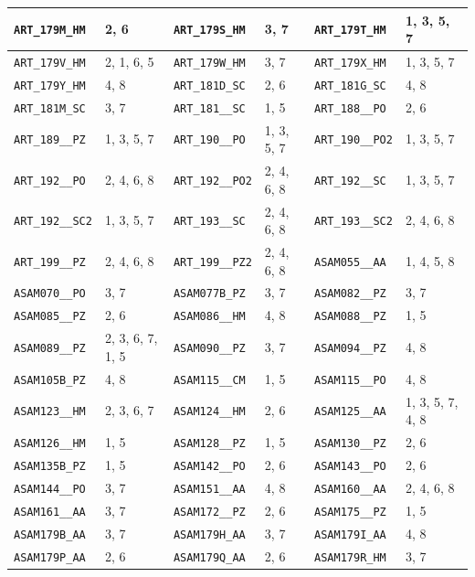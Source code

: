 \begin{longtable}{|l|l||l|l||l|l|}
    \verb|ART_179M_HM| & 2, 6 & \verb|ART_179S_HM| & 3, 7 & \verb|ART_179T_HM| & 1, 3, 5, 7\\\hline
    \verb|ART_179V_HM| & 2, 1, 6, 5 & \verb|ART_179W_HM| & 3, 7 & \verb|ART_179X_HM| & 1, 3, 5, 7\\\hline
    \verb|ART_179Y_HM| & 4, 8 & \verb|ART_181D_SC| & 2, 6 & \verb|ART_181G_SC| & 4, 8\\\hline
    \verb|ART_181M_SC| & 3, 7 & \verb|ART_181__SC| & 1, 5 & \verb|ART_188__PO| & 2, 6\\\hline
    \verb|ART_189__PZ| & 1, 3, 5, 7 & \verb|ART_190__PO| & 1, 3, 5, 7 & \verb|ART_190__PO2| & 1, 3, 5, 7\\\hline
    \verb|ART_192__PO| & 2, 4, 6, 8 & \verb|ART_192__PO2| & 2, 4, 6, 8 & \verb|ART_192__SC| & 1, 3, 5, 7\\\hline
    \verb|ART_192__SC2| & 1, 3, 5, 7 & \verb|ART_193__SC| & 2, 4, 6, 8 & \verb|ART_193__SC2| & 2, 4, 6, 8\\\hline
    \verb|ART_199__PZ| & 2, 4, 6, 8 & \verb|ART_199__PZ2| & 2, 4, 6, 8 & \verb|ASAM055__AA| & 1, 4, 5, 8\\\hline
    \verb|ASAM070__PO| & 3, 7 & \verb|ASAM077B_PZ| & 3, 7 & \verb|ASAM082__PZ| & 3, 7\\\hline
    \verb|ASAM085__PZ| & 2, 6 & \verb|ASAM086__HM| & 4, 8 & \verb|ASAM088__PZ| & 1, 5\\\hline
    \verb|ASAM089__PZ| & 2, 3, 6, 7, 1, 5 & \verb|ASAM090__PZ| & 3, 7 & \verb|ASAM094__PZ| & 4, 8\\\hline
    \verb|ASAM105B_PZ| & 4, 8 & \verb|ASAM115__CM| & 1, 5 & \verb|ASAM115__PO| & 4, 8\\\hline
    \verb|ASAM123__HM| & 2, 3, 6, 7 & \verb|ASAM124__HM| & 2, 6 & \verb|ASAM125__AA| & 1, 3, 5, 7, 4, 8\\\hline
    \verb|ASAM126__HM| & 1, 5 & \verb|ASAM128__PZ| & 1, 5 & \verb|ASAM130__PZ| & 2, 6\\\hline
    \verb|ASAM135B_PZ| & 1, 5 & \verb|ASAM142__PO| & 2, 6 & \verb|ASAM143__PO| & 2, 6\\\hline
    \verb|ASAM144__PO| & 3, 7 & \verb|ASAM151__AA| & 4, 8 & \verb|ASAM160__AA| & 2, 4, 6, 8\\\hline
    \verb|ASAM161__AA| & 3, 7 & \verb|ASAM172__PZ| & 2, 6 & \verb|ASAM175__PZ| & 1, 5\\\hline
    \verb|ASAM179B_AA| & 3, 7 & \verb|ASAM179H_AA| & 3, 7 & \verb|ASAM179I_AA| & 4, 8\\\hline
    \verb|ASAM179P_AA| & 2, 6 & \verb|ASAM179Q_AA| & 2, 6 & \verb|ASAM179R_HM| & 3, 7\\\hline

\end{longtable}

